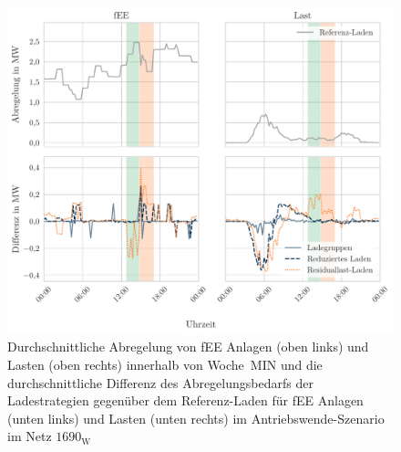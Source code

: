 \begin{figure}[H]
    \centering
    \includegraphics[width=\textwidth]{Bilder/1690_fEE_load_diff}
    \caption[Durchschnittliche Abregelung von fEE Anlagen und Lasten innerhalb von Woche~MIN und die durchschnittliche Differenz des Abregelungsbedarfs der Ladestrategien gegenüber dem Referenz-Laden für fEE Anlagen und Lasten im Antriebswende-Szenario im Netz \num{1690}]{Durchschnittliche Abregelung von fEE Anlagen (oben links) und Lasten (oben rechts) innerhalb von Woche~MIN und die durchschnittliche Differenz des Abregelungsbedarfs der Ladestrategien gegenüber dem Referenz-Laden für fEE Anlagen (unten links) und Lasten (unten rechts) im Antriebswende-Szenario im Netz \(1690_{\text{W}}\)}\label{fig:1690_fEE_load_diff}
\end{figure}